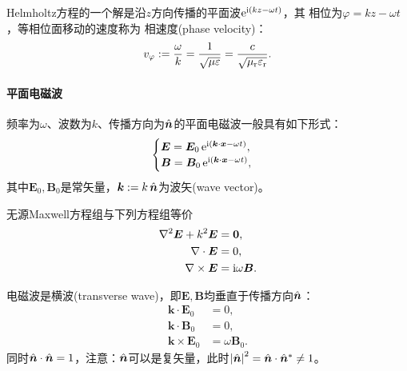 Helmholtz方程的一个解是沿$z$方向传播的平面波$\mathop{}\!\mathrm{e}^{\mathrm{i}(kz-\omega t)}$，其
相位为$\varphi=kz-\omega t$，等相位面移动的速度称为
相速度(phase velocity)：
\begin{equation}
    v_\varphi:=\frac{\omega}k=\frac1{\sqrt{\mu\varepsilon}}=\frac{c}{\sqrt{\mu_\text r\varepsilon_\text r}}.
\end{equation}

\paragraph{平面电磁波}

频率为$\omega$、波数为$k$、传播方向为$\mathop{}\!\hat{\bm{n}}$的平面电磁波一般具有如下形式：
\begin{equation}
    \begin{cases}
        \bm E=\bm E_0\mathop{}\!\mathrm{e}^{\mathrm{i}(\bm k\cdot\bm x-\omega t)},\\
        \bm B=\bm B_0\mathop{}\!\mathrm{e}^{\mathrm{i}(\bm k\cdot\bm x-\omega t)},
    \end{cases}
\end{equation}
其中$\bm E_0,\bm B_0$是常矢量，$\bm k:=k\mathop{}\!\hat{\bm{n}}$为波矢(wave vector)。
\begin{theorem}{}{}
    无源Maxwell方程组与下列方程组等价
    \begin{subequations}
        \begin{align}
            \nabla^2\bm E+k^2\bm E&=\bm 0,\\
            \nabla\cdot\bm E&=0,\\
            \nabla\times\bm E&=\mathrm{i}\omega\bm B.
        \end{align}
    \end{subequations}
\end{theorem}
\begin{corollary}
    电磁波是横波(transverse wave)，即$\bm E,\bm B$均垂直于传播方向$\mathop{}\!\hat{\bm{n}}$：
    \begin{subequations}
        \label{eqn:transverse}
        \begin{align}
            \bm k\cdot\bm E_0&=0,\\
            \bm k\cdot\bm B_0&=0,\\
            \bm k\times\bm E_0&=\omega\bm B_0.
        \end{align}
    \end{subequations}
    同时$\mathop{}\!\hat{\bm{n}}\cdot\mathop{}\!\hat{\bm{n}}=1$，注意：$\mathop{}\!\hat{\bm{n}}$可以是复矢量，此时$\left\lvert\mathop{}\!\hat{\bm{n}}\right\rvert^2=\mathop{}\!\hat{\bm{n}}\cdot\mathop{}\!\hat{\bm{n}}^*\neq 1$。
\end{corollary}

